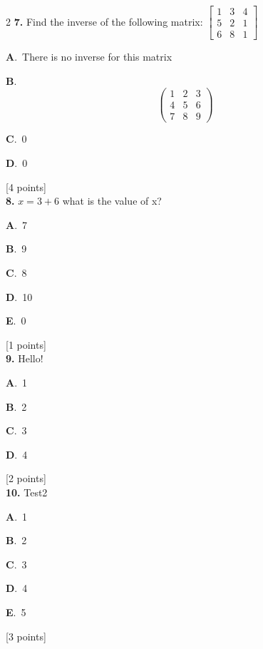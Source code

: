 \documentclass[12pt]{article}
\newcommand{\choice}[3]{%
  \noindent\textbf{#1}.~#2\hfill#3\par\vspace{0.25em}
}
\begin{document}
\begin{multicols}{2}
\noindent \textbf{\textenglish{7.}} {\textenglish{Find the inverse of the following matrix: }}\(\begin{bmatrix} 1 & 3 & 4 \\ 5 & 2 & 1 \\ 6 & 8 & 1 \end{bmatrix}\)

\noindent\choice{A}{{\textenglish{There is no inverse for this matrix}}}{}
\noindent\choice{B}{\[\begin{pmatrix} 1 & 2 & 3 \\ 4 & 5 & 6 \\ 7 & 8 & 9  \end{pmatrix}\]}{}
\noindent\choice{C}{{\textenglish{0}}}{}
\noindent\choice{D}{{\textenglish{0}}}{}
\hfill {\textenglish{[4 points]}}\\[0.5em]

\noindent \textbf{\textenglish{8.}} \(x=3+6 \){\textenglish{ what is the value of x?}}

\noindent\choice{A}{{\textenglish{7}}}{}
\noindent\choice{B}{{\textenglish{9}}}{}
\noindent\choice{C}{{\textenglish{8}}}{}
\noindent\choice{D}{{\textenglish{10}}}{}
\noindent\choice{E}{{\textenglish{0}}}{}
\hfill {\textenglish{[1 points]}}\\[0.5em]

\noindent \textbf{\textenglish{9.}} {\textenglish{Hello!}}

\noindent\choice{A}{{\textenglish{1}}}{}
\noindent\choice{B}{{\textenglish{2}}}{}
\noindent\choice{C}{{\textenglish{3}}}{}
\noindent\choice{D}{{\textenglish{4}}}{}
\hfill {\textenglish{[2 points]}}\\[0.5em]

\noindent \textbf{\textenglish{10.}} {\textenglish{Test2}}

\noindent\choice{A}{{\textenglish{1}}}{}
\noindent\choice{B}{{\textenglish{2}}}{}
\noindent\choice{C}{{\textenglish{3}}}{}
\noindent\choice{D}{{\textenglish{4}}}{}
\noindent\choice{E}{{\textenglish{5}}}{}
\hfill {\textenglish{[3 points]}}\\[0.5em]


\end{multicols}
\end{document}
